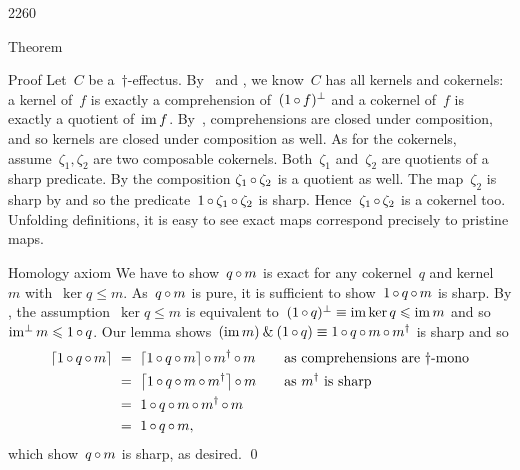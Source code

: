 \begin{parsec}{2260}
\begin{point}{50}{Theorem}
\begin{enumerate}
\end{enumerate}
\spacingfix{}
\begin{point}{60}{Proof}%
Let~$C$ be a~$\dagger$-effectus.
By~ and ,
    we know~$C$ has all kernels and cokernels:
    a kernel of~$f$ is exactly a comprehension of~$(1 \mathop{\circ} f)^\perp$
    and a cokernel of~$f$ is exactly a quotient of~$\operatorname{im} f$.
By~,
    comprehensions are closed under composition,
    and so kernels are closed under composition as well.
As for the cokernels,
    assume~$\zeta_1, \zeta_2$ are two composable cokernels.
Both~$\zeta_1$ and~$\zeta_2$ are quotients of a sharp predicate.
By  the composition  $\zeta_1 \mathop{\circ} \zeta_2$
    is a quotient as well.
The map~$\zeta_2$ is sharp by 
    and so the predicate~$1 \mathop{\circ} \zeta_1 \mathop{\circ} \zeta_2$ is sharp.
Hence~$\zeta_1 \mathop{\circ} \zeta_2$ is a cokernel too.
Unfolding definitions, it is easy to see exact maps correspond precisely
    to pristine maps.
\begin{point}{70}{Homology axiom}%
We have to show~$q \mathop{\circ} m$
    is exact for any cokernel~$q$ and kernel~$m$ with~$\ker q \leq m$.
As~$q \mathop{\circ} m$ is pure,
    it is sufficient to show~$1 \mathop{\circ} q \mathop{\circ} m$ is sharp.
By ,
the assumption~$\ker q \leq m$
    is equivalent to~$(1 \mathop{\circ} q)^\perp \equiv \operatorname{im} \ker q \leqslant \operatorname{im} m$
    and so~$\operatorname{im^\perp} m \leqslant 1 \mathop{\circ} q$.
Our lemma 
    shows~$(\operatorname{im} m) \mathbin{\&} (1 \mathop{\circ} q)
    \equiv 1 \mathop{\circ} q \mathop{\circ} m \mathop{\circ} m^\dagger$ is sharp
    and so
\begin{align*}
    \left\lceil1 \mathop{\circ} q \mathop{\circ} m\right\rceil
    &\ = \ \left\lceil1 \mathop{\circ} q \mathop{\circ} m\right\rceil \mathop{\circ} m^\dagger \mathop{\circ} m 
        &\quad&\text{as comprehensions are~$\dagger$-mono}\\
    &\ = \ \left\lceil1 \mathop{\circ} q \mathop{\circ} m \mathop{\circ} m^\dagger\right\rceil \mathop{\circ} m 
        &&\text{as $m^\dagger$ is sharp} \\
    &\ = \ 1 \mathop{\circ} q  \mathop{\circ}  m \mathop{\circ} m^\dagger \mathop{\circ} m  \\
    &\ = \ 1 \mathop{\circ} q  \mathop{\circ}  m,
\end{align*}
which show~$q \mathop{\circ} m$ is sharp, as desired. \qed
\end{point}
\end{point}
\end{point}
\end{parsec}
